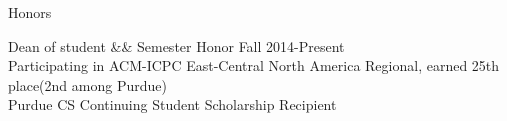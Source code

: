 \documentclass{resume} %
\begin{document}
\begin{rSection}{Honors}{}{}


Dean of student \&\& Semester Honor  \hspace{90mm} Fall  2014-Present\\ 
Participating in ACM-ICPC East-Central North America Regional, earned 25th place(2nd among Purdue)  \\
Purdue CS Continuing Student Scholarship Recipient \\




\end{rSection}

\end{document}
